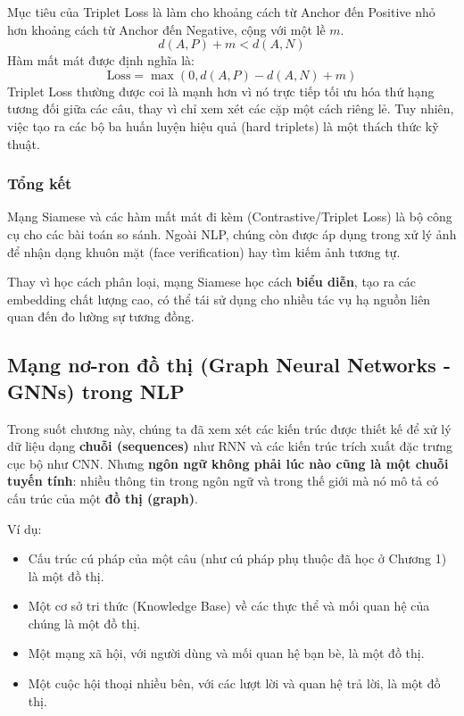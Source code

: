 Mục tiêu của Triplet Loss là làm cho khoảng cách từ Anchor đến Positive nhỏ hơn khoảng cách từ Anchor đến Negative, cộng với một lề $m$.
$$ d(A, P) + m < d(A, N) $$
Hàm mất mát được định nghĩa là:
\begin{equation}
    \text{Loss} = \max(0, d(A, P) - d(A, N) + m)
    \label{eq:triplet_loss}
\end{equation}
Triplet Loss thường được coi là mạnh hơn vì nó trực tiếp tối ưu hóa thứ hạng tương đối giữa các câu, thay vì chỉ xem xét các cặp một cách riêng lẻ. Tuy nhiên, việc tạo ra các bộ ba huấn luyện hiệu quả (hard triplets) là một thách thức kỹ thuật.

\subsubsection{Tổng kết}
Mạng Siamese và các hàm mất mát đi kèm (Contrastive/Triplet Loss) là bộ công cụ cho các bài toán so sánh. Ngoài NLP, chúng còn được áp dụng trong xử lý ảnh để nhận dạng khuôn mặt (face verification) hay tìm kiếm ảnh tương tự.

Thay vì học cách phân loại, mạng Siamese học cách \textbf{biểu diễn}, tạo ra các embedding chất lượng cao, có thể tái sử dụng cho nhiều tác vụ hạ nguồn liên quan đến đo lường sự tương đồng.

\subsection{Mạng nơ-ron đồ thị (Graph Neural Networks - GNNs) trong NLP}
\label{ssec:gnn_for_nlp}

Trong suốt chương này, chúng ta đã xem xét các kiến trúc được thiết kế để xử lý dữ liệu dạng \textbf{chuỗi (sequences)} như RNN và các kiến trúc trích xuất đặc trưng cục bộ như CNN. Nhưng \textbf{ngôn ngữ không phải lúc nào cũng là một chuỗi tuyến tính}: nhiều thông tin trong ngôn ngữ và trong thế giới mà nó mô tả có cấu trúc của một \textbf{đồ thị (graph)}.

Ví dụ:
\begin{itemize}
    \item Cấu trúc cú pháp của một câu (như cú pháp phụ thuộc đã học ở Chương 1) là một đồ thị.
    \item Một cơ sở tri thức (Knowledge Base) về các thực thể và mối quan hệ của chúng là một đồ thị.
    \item Một mạng xã hội, với người dùng và mối quan hệ bạn bè, là một đồ thị.
    \item Một cuộc hội thoại nhiều bên, với các lượt lời và quan hệ trả lời, là một đồ thị.
\end{itemize}

